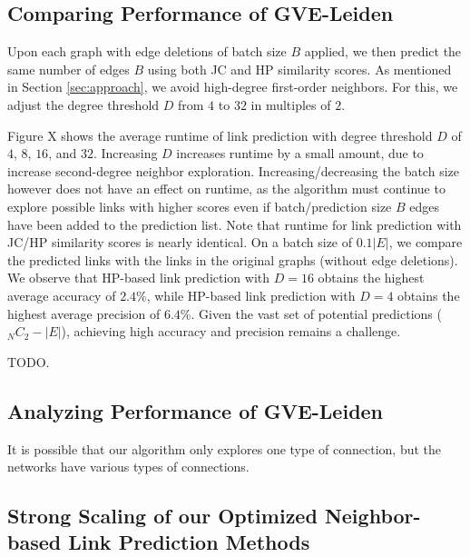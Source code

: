 
% 
% 




\subsection{Comparing Performance of GVE-Leiden}

Upon each graph with edge deletions of batch size $B$ applied, we then predict the same number of edges $B$ using both JC and HP similarity scores. As mentioned in Section \ref{sec:approach}, we avoid high-degree first-order neighbors. For this, we adjust the degree threshold $D$ from $4$ to $32$ in multiples of $2$.

Figure X shows the average runtime of link prediction with degree threshold $D$ of $4$, $8$, $16$, and $32$. Increasing $D$ increases runtime by a small amount, due to increase second-degree neighbor exploration. Increasing/decreasing the batch size however does not have an effect on runtime, as the algorithm must continue to explore possible links with higher scores even if batch/prediction size $B$ edges have been added to the prediction list. Note that runtime for link prediction with JC/HP similarity scores is nearly identical. On a batch size of $0.1 |E|$, we compare the predicted links with the links in the original graphs (without edge deletions). We observe that HP-based link prediction with $D = 16$ obtains the highest average accuracy of $2.4\%$, while HP-based link prediction with $D = 4$ obtains the highest average precision of $6.4\%$. Given the vast set of potential predictions (${}_N C_2 - |E|$), achieving high accuracy and precision remains a challenge.

TODO.







\subsection{Analyzing Performance of GVE-Leiden}

It is possible that our algorithm only explores one type of connection, but the networks have various types of connections.




\subsection{Strong Scaling of our Optimized Neighbor-based Link Prediction Methods}

